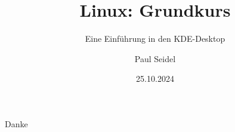 \documentclass{beamer}
\title{Linux: Grundkurs}
\subtitle{Eine Einführung in den KDE-Desktop}
\author{Paul Seidel}
\date{25.10.2024} %
\institute{ZKK - Universität Passau}
\begin{document}
    \maketitle

    
    
    
    
    
    
    
    
    

    \begin{frame}[standout]
        Danke
    \end{frame}
\end{document}
